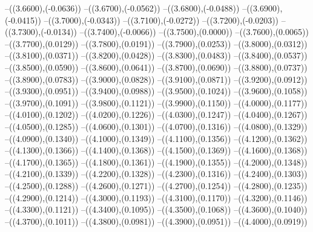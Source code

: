 {	--({\sx*(3.6600)},{\sy*(-0.0636)})
	--({\sx*(3.6700)},{\sy*(-0.0562)})
	--({\sx*(3.6800)},{\sy*(-0.0488)})
	--({\sx*(3.6900)},{\sy*(-0.0415)})
	--({\sx*(3.7000)},{\sy*(-0.0343)})
	--({\sx*(3.7100)},{\sy*(-0.0272)})
	--({\sx*(3.7200)},{\sy*(-0.0203)})
	--({\sx*(3.7300)},{\sy*(-0.0134)})
	--({\sx*(3.7400)},{\sy*(-0.0066)})
	--({\sx*(3.7500)},{\sy*(0.0000)})
	--({\sx*(3.7600)},{\sy*(0.0065)})
	--({\sx*(3.7700)},{\sy*(0.0129)})
	--({\sx*(3.7800)},{\sy*(0.0191)})
	--({\sx*(3.7900)},{\sy*(0.0253)})
	--({\sx*(3.8000)},{\sy*(0.0312)})
	--({\sx*(3.8100)},{\sy*(0.0371)})
	--({\sx*(3.8200)},{\sy*(0.0428)})
	--({\sx*(3.8300)},{\sy*(0.0483)})
	--({\sx*(3.8400)},{\sy*(0.0537)})
	--({\sx*(3.8500)},{\sy*(0.0590)})
	--({\sx*(3.8600)},{\sy*(0.0641)})
	--({\sx*(3.8700)},{\sy*(0.0690)})
	--({\sx*(3.8800)},{\sy*(0.0737)})
	--({\sx*(3.8900)},{\sy*(0.0783)})
	--({\sx*(3.9000)},{\sy*(0.0828)})
	--({\sx*(3.9100)},{\sy*(0.0871)})
	--({\sx*(3.9200)},{\sy*(0.0912)})
	--({\sx*(3.9300)},{\sy*(0.0951)})
	--({\sx*(3.9400)},{\sy*(0.0988)})
	--({\sx*(3.9500)},{\sy*(0.1024)})
	--({\sx*(3.9600)},{\sy*(0.1058)})
	--({\sx*(3.9700)},{\sy*(0.1091)})
	--({\sx*(3.9800)},{\sy*(0.1121)})
	--({\sx*(3.9900)},{\sy*(0.1150)})
	--({\sx*(4.0000)},{\sy*(0.1177)})
	--({\sx*(4.0100)},{\sy*(0.1202)})
	--({\sx*(4.0200)},{\sy*(0.1226)})
	--({\sx*(4.0300)},{\sy*(0.1247)})
	--({\sx*(4.0400)},{\sy*(0.1267)})
	--({\sx*(4.0500)},{\sy*(0.1285)})
	--({\sx*(4.0600)},{\sy*(0.1301)})
	--({\sx*(4.0700)},{\sy*(0.1316)})
	--({\sx*(4.0800)},{\sy*(0.1329)})
	--({\sx*(4.0900)},{\sy*(0.1340)})
	--({\sx*(4.1000)},{\sy*(0.1349)})
	--({\sx*(4.1100)},{\sy*(0.1356)})
	--({\sx*(4.1200)},{\sy*(0.1362)})
	--({\sx*(4.1300)},{\sy*(0.1366)})
	--({\sx*(4.1400)},{\sy*(0.1368)})
	--({\sx*(4.1500)},{\sy*(0.1369)})
	--({\sx*(4.1600)},{\sy*(0.1368)})
	--({\sx*(4.1700)},{\sy*(0.1365)})
	--({\sx*(4.1800)},{\sy*(0.1361)})
	--({\sx*(4.1900)},{\sy*(0.1355)})
	--({\sx*(4.2000)},{\sy*(0.1348)})
	--({\sx*(4.2100)},{\sy*(0.1339)})
	--({\sx*(4.2200)},{\sy*(0.1328)})
	--({\sx*(4.2300)},{\sy*(0.1316)})
	--({\sx*(4.2400)},{\sy*(0.1303)})
	--({\sx*(4.2500)},{\sy*(0.1288)})
	--({\sx*(4.2600)},{\sy*(0.1271)})
	--({\sx*(4.2700)},{\sy*(0.1254)})
	--({\sx*(4.2800)},{\sy*(0.1235)})
	--({\sx*(4.2900)},{\sy*(0.1214)})
	--({\sx*(4.3000)},{\sy*(0.1193)})
	--({\sx*(4.3100)},{\sy*(0.1170)})
	--({\sx*(4.3200)},{\sy*(0.1146)})
	--({\sx*(4.3300)},{\sy*(0.1121)})
	--({\sx*(4.3400)},{\sy*(0.1095)})
	--({\sx*(4.3500)},{\sy*(0.1068)})
	--({\sx*(4.3600)},{\sy*(0.1040)})
	--({\sx*(4.3700)},{\sy*(0.1011)})
	--({\sx*(4.3800)},{\sy*(0.0981)})
	--({\sx*(4.3900)},{\sy*(0.0951)})
	--({\sx*(4.4000)},{\sy*(0.0919)})
}
